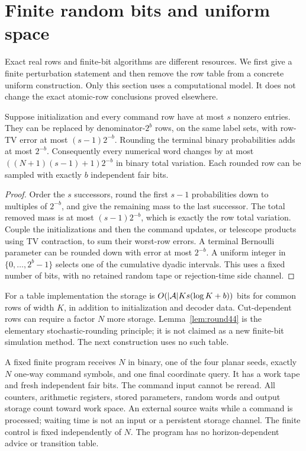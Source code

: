 \section{Finite random bits and uniform space}\label{sec:bits44}
Exact real rows and finite-bit algorithms are different resources. We
first give a finite perturbation statement and then remove the row table
from a concrete uniform construction. Only this section uses a
computational model. It does not change the exact atomic-row conclusions
proved elsewhere.

\begin{lemma}\label{lem:round44}
Suppose initialization and every command row have at most $s$ nonzero
entries. They can be replaced by denominator-$2^b$ rows, on the same
label sets, with row-TV error at most $(s-1)2^{-b}$. Rounding the terminal
binary probabilities adds at most $2^{-b}$. Consequently every numerical
word changes by at most $((N+1)(s-1)+1)2^{-b}$ in binary total variation.
Each rounded row can be sampled with exactly $b$ independent fair bits.
\end{lemma}
\begin{proof}
Order the $s$ successors, round the first $s-1$ probabilities down to
multiples of $2^{-b}$, and give the remaining mass to the last successor.
The total removed mass is at most $(s-1)2^{-b}$, which is exactly the
row total variation. Couple the initializations and then the command
updates, or telescope products using TV contraction, to sum their
worst-row errors. A terminal Bernoulli parameter can be rounded down
with error at most $2^{-b}$. A uniform integer in $\{0,\ldots,2^b-1\}$
selects one of the cumulative dyadic intervals. This uses a fixed number
of bits, with no retained random tape or rejection-time side channel.
\end{proof}

For a table implementation the storage is
$O(|\mathcal A|Ks(\log K+b))$ bits for common rows of width $K$, in addition
to initialization and decoder data. Cut-dependent rows can require a
factor $N$ more storage. Lemma~\ref{lem:round44} is the elementary
stochastic-rounding principle; it is not claimed as a new finite-bit
simulation method. The next construction uses no such table.

\begin{definition}\label{def:uniform44}
A fixed finite program receives $N$ in binary, one of the four planar
seeds, exactly $N$ one-way command symbols, and one final coordinate
query. It has a work tape and fresh independent fair bits. The command
input cannot be reread. All counters, arithmetic registers, stored
parameters, random words and output storage count toward work space.
An external source waits while a command is processed; waiting time is
not an input or a persistent storage channel. The finite control is
fixed independently of $N$. The program has no horizon-dependent advice
or transition table.
\end{definition}

